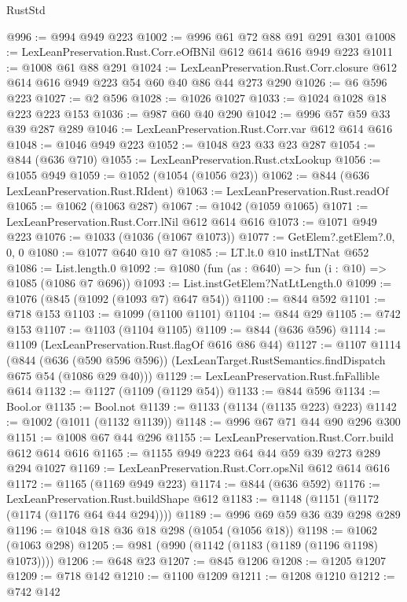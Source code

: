 \begin{lexlean}{RustStd}
\begin{coremodule}
@996 := @994 @949 @223
@1002 := @996 @61 @72 @88 @91 @291 @301
@1008 := LexLeanPreservation.Rust.Corr.eOfBNil @612 @614 @616 @949 @223
@1011 := @1008 @61 @88 @291
@1024 := LexLeanPreservation.Rust.Corr.closure
    @612
    @614
    @616
    @949
    @223
    @54
    @60
    @40
    @86
    @44
    @273
    @290
@1026 := @6 @596 @223
@1027 := @2 @596
@1028 := @1026 @1027
@1033 := @1024 @1028 @18 @223 @223 @153
@1036 := @987 @60 @40 @290
@1042 := @996 @57 @59 @33 @39 @287 @289
@1046 := LexLeanPreservation.Rust.Corr.var @612 @614 @616
@1048 := @1046 @949 @223
@1052 := @1048 @23 @33 @23 @287
@1054 := @844 (@636 @710)
@1055 := LexLeanPreservation.Rust.ctxLookup
@1056 := @1055 @949
@1059 := @1052 (@1054 (@1056 @23))
@1062 := @844 (@636 LexLeanPreservation.Rust.RIdent)
@1063 := LexLeanPreservation.Rust.readOf
@1065 := @1062 (@1063 @287)
@1067 := @1042 (@1059 @1065)
@1071 := LexLeanPreservation.Rust.Corr.lNil @612 @614 @616
@1073 := @1071 @949 @223
@1076 := @1033 (@1036 (@1067 @1073))
@1077 := GetElem?.getElem?.{0, 0, 0}
@1080 := @1077 @640 @10 @7
@1085 := LT.lt.{0} @10 instLTNat @652
@1086 := List.length.{0}
@1092 := @1080 (fun (as : @640) => fun (i : @10) => @1085 (@1086 @7 @696))
@1093 := List.instGetElem?NatLtLength.{0}
@1099 := @1076 (@845 (@1092 (@1093 @7) @647 @54))
@1100 := @844 @592
@1101 := @718 @153
@1103 := @1099 (@1100 @1101)
@1104 := @844 @29
@1105 := @742 @153
@1107 := @1103 (@1104 @1105)
@1109 := @844 (@636 @596)
@1114 := @1109 (LexLeanPreservation.Rust.flagOf @616 @86 @44)
@1127 := @1107
    @1114
    (@844
      (@636 (@590 @596 @596))
      (LexLeanTarget.RustSemantics.findDispatch @675 @54 (@1086 @29 @40)))
@1129 := LexLeanPreservation.Rust.fnFallible @614
@1132 := @1127 (@1109 (@1129 @54))
@1133 := @844 @596
@1134 := Bool.or
@1135 := Bool.not
@1139 := @1133 (@1134 (@1135 @223) @223)
@1142 := @1002 (@1011 (@1132 @1139))
@1148 := @996 @67 @71 @44 @90 @296 @300
@1151 := @1008 @67 @44 @296
@1155 := LexLeanPreservation.Rust.Corr.build @612 @614 @616
@1165 := @1155 @949 @223 @64 @44 @59 @39 @273 @289 @294 @1027
@1169 := LexLeanPreservation.Rust.Corr.opsNil @612 @614 @616
@1172 := @1165 (@1169 @949 @223)
@1174 := @844 (@636 @592)
@1176 := LexLeanPreservation.Rust.buildShape @612
@1183 := @1148 (@1151 (@1172 (@1174 (@1176 @64 @44 @294))))
@1189 := @996 @69 @59 @36 @39 @298 @289
@1196 := @1048 @18 @36 @18 @298 (@1054 (@1056 @18))
@1198 := @1062 (@1063 @298)
@1205 := @981 (@990 (@1142 (@1183 (@1189 (@1196 @1198) @1073))))
@1206 := @648 @23
@1207 := @845 @1206
@1208 := @1205 @1207
@1209 := @718 @142
@1210 := @1100 @1209
@1211 := @1208 @1210
@1212 := @742 @142

\end{coremodule}
\end{lexlean}

